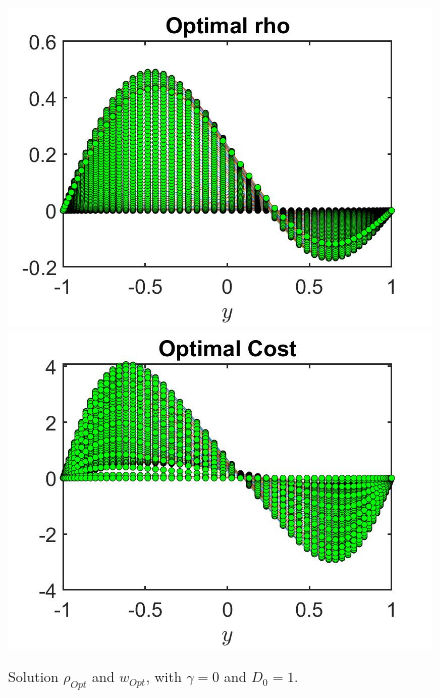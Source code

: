 \documentclass[11pt, a4paper]{article}
\theoremstyle{definition}
\begin{document}
\begin{figure}[h]
	\includegraphics[scale=0.3]{DFrhoOpt0.jpg}
	\includegraphics[scale=0.3]{DFwOpt0.jpg}
	\caption{Solution $\rho_{Opt}$ and $w_{Opt}$, with $\gamma = 0$ and $D_0 = 1$.}
	\label{rhoDF0}
\end{figure}
\end{document}
